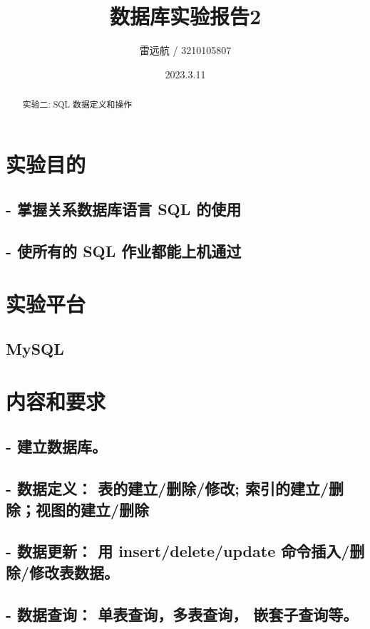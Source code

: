 \documentclass{article}
\title{数据库实验报告2}
\author{雷远航 / 3210105807}
\date{2023.3.11}
\begin{document}


\maketitle


\begin{abstract}
    实验二: SQL 数据定义和操作
\end{abstract}

\section{实验目的}
    \subsection*{- 掌握关系数据库语言 SQL 的使用}
    \subsection*{- 使所有的 SQL 作业都能上机通过}

\section{实验平台}
    \subsection*{MySQL}

\section{内容和要求}
    \subsection*{- 建立数据库。}
    \subsection*{- 数据定义： 表的建立/删除/修改; 索引的建立/删除；视图的建立/删除}
    \subsection*{- 数据更新： 用 insert/delete/update 命令插入/删除/修改表数据。}
    \subsection*{- 数据查询： 单表查询，多表查询， 嵌套子查询等。}
\end{document}
